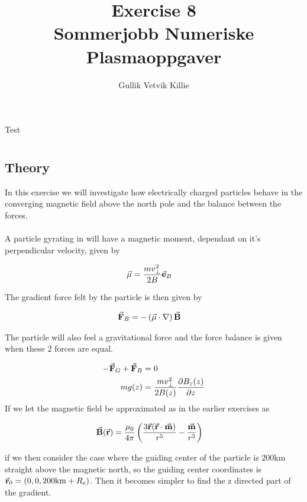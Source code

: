 \documentclass[x11names]{article}
\title{ Exercise 8 \\ Sommerjobb Numeriske Plasmaoppgaver }
\author{Gullik Vetvik Killie
		}
\begin{document}
\maketitle
Test

\section{}

\subsection{Theory}
  In this exercise we will investigate how electrically charged particles behave in the converging magnetic field above the north pole and the balance between the forces.
\\ \\
  A particle gyrating in will have a magnetic moment, dependant on it's perpendicular velocity, given by

  \begin{align}
    \va{\mu} &= \frac{mv_\perp^2}{2B} \va{e}_B
  \end{align}

  The gradient force felt by the particle is then given by

  \begin{align}
    \va{F}_B &= -\left( \va{\mu}\cdot\nabla \right)\va{B}
  \end{align}

  The particle will also feel a gravitational force and the force balance is given when these 2 forces are equal.

  \begin{align}
    -\va{F}_G + \va{F}_B &= 0  
    \\
    mg(z) &= \frac{mv_\perp^2}{2B(z)} \pdv{B_z(z)}{z}
  \end{align}
  \noindent If we let the magnetic field be approximated as in the earlier exercises as

  \begin{align}
    \va{B}(\va{r}) &= \frac{\mu_0}{4\pi}\left( \frac{3\va{r}(\va{r}\cdot\va{m}  )}{r^5} - \frac{\va{m}}{r^3} \right)
  \end{align}

  \noindent if we then consider the case where the guiding center of the particle is \(200 \si{\kilo\meter}\) straight above the magnetic north, so the guiding center coordinates is
  \( \va{r}_0 = (0,0,200\si{\kilo\meter} + R_e)\). Then it becomes simpler to find the z directed part of the gradient.
\end{document}
